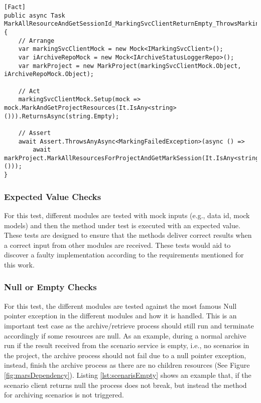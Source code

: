 \newpage
\begin{lstlisting}[language={[Sharp]C}, caption={Exception catch test example}, captionpos=b,label={lst:exceptionCatch}]
[Fact]
public async Task MarkAllResourceAndGetSessionId_MarkingSvcClientReturnEmpty_ThrowsMarkingFailedException()
{
    // Arrange
    var markingSvcClientMock = new Mock<IMarkingSvcClient>();
    var iArchiveRepoMock = new Mock<IArchiveStatusLoggerRepo>();
    var markProject = new MarkProject(markingSvcClientMock.Object, iArchiveRepoMock.Object);
    
    // Act 
    markingSvcClientMock.Setup(mock => mock.MarkAndGetProjectResources(It.IsAny<string>())).ReturnsAsync(string.Empty);
    
    // Assert
    await Assert.ThrowsAnyAsync<MarkingFailedException>(async () =>
        await markProject.MarkAllResourcesForProjectAndGetMarkSession(It.IsAny<string>()));
}
\end{lstlisting}

\subsubsection{Expected Value Checks}
For this test, different modules are tested with mock inputs (e.g., data id, mock models) and then the method under test is executed with an 
expected value. These tests are designed to ensure that the methods deliver correct results when a correct input from other modules are received.
These tests would aid to discover a faulty implementation according to the requirements mentioned for this work.

\subsubsection{Null or Empty Checks}
For this test, the different modules are tested against the most famous Null pointer exception in the different modules and how it is handled. This is an important
test case as the archive/retrieve process should still run and terminate accordingly if some resources are null. As an example, during a normal archive run if the result received from
the scenario service is empty, i.e., no scenarios in the project, the archive process should not fail due to a null pointer exception, instead, finish the archive process
as there are no children resources (See Figure \ref{fig:marsDependency}). Listing \ref{lst:scenarisEmpty} shows an example that, if the scenario client returns null 
the process does not break, but instead the method for archiving scenarios is not triggered. 

